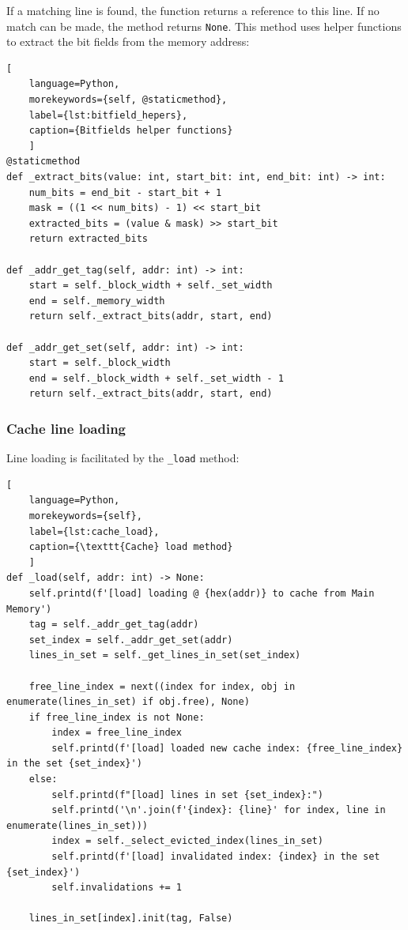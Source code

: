 \noindent If a matching line is found, the function returns a reference to this line. If no match can be made, the method returns \texttt{None}. This method uses helper functions
to extract the bit fields from the memory address:


\begin{center}
\centering
\begin{minipage}{\linewidth}
\begin{lstlisting}[
    language=Python,
	morekeywords={self, @staticmethod},
    label={lst:bitfield_hepers},
    caption={Bitfields helper functions}
    ]
@staticmethod
def _extract_bits(value: int, start_bit: int, end_bit: int) -> int:
    num_bits = end_bit - start_bit + 1
    mask = ((1 << num_bits) - 1) << start_bit
    extracted_bits = (value & mask) >> start_bit
    return extracted_bits

def _addr_get_tag(self, addr: int) -> int:
    start = self._block_width + self._set_width
    end = self._memory_width
    return self._extract_bits(addr, start, end)

def _addr_get_set(self, addr: int) -> int:
    start = self._block_width
    end = self._block_width + self._set_width - 1
    return self._extract_bits(addr, start, end)
\end{lstlisting}
\end{minipage}
\end{center}

\subsubsection*{Cache line loading}
\noindent Line loading is facilitated by the \texttt{\_load} method:

\begin{center}
\centering
\begin{minipage}{\linewidth}
\begin{lstlisting}[
    language=Python,
	morekeywords={self},
    label={lst:cache_load},
    caption={\texttt{Cache} load method}
    ]
def _load(self, addr: int) -> None:
    self.printd(f'[load] loading @ {hex(addr)} to cache from Main Memory')
    tag = self._addr_get_tag(addr)
    set_index = self._addr_get_set(addr)
    lines_in_set = self._get_lines_in_set(set_index)

    free_line_index = next((index for index, obj in enumerate(lines_in_set) if obj.free), None)
    if free_line_index is not None:
        index = free_line_index
        self.printd(f'[load] loaded new cache index: {free_line_index} in the set {set_index}')
    else:
        self.printd(f"[load] lines in set {set_index}:")
        self.printd('\n'.join(f'{index}: {line}' for index, line in enumerate(lines_in_set)))
        index = self._select_evicted_index(lines_in_set)
        self.printd(f'[load] invalidated index: {index} in the set {set_index}')
        self.invalidations += 1

    lines_in_set[index].init(tag, False)
\end{lstlisting}
\end{minipage}
\end{center}

